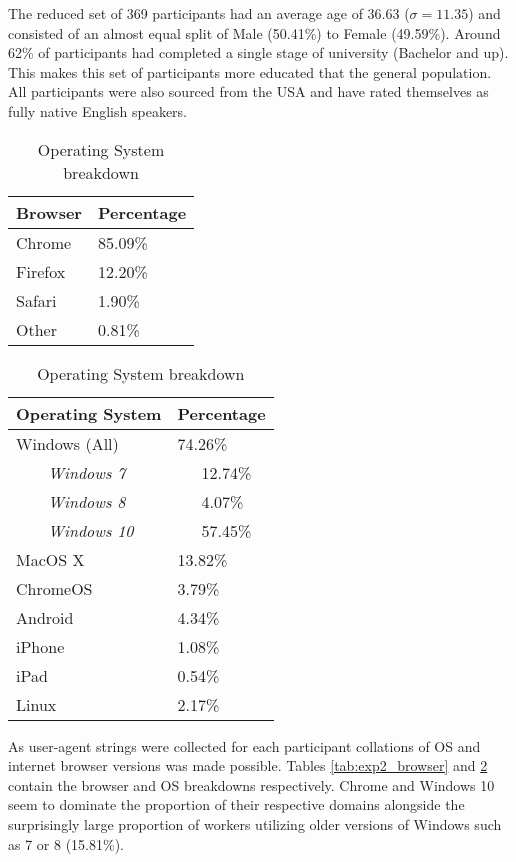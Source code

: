 The reduced set of 369 participants had an average age of 36.63 ($\sigma = 11.35$) and consisted of an almost equal split of Male (50.41\%) to Female (49.59\%). Around 62\% of participants had completed a single stage of university (Bachelor and up). This makes this set of participants more educated that the general population. All participants were also sourced from the USA and have rated themselves as fully native English speakers.
\begin{table}[!h]
    \centering
    \begin{tabular}{|l|l|}
        \hline
        Browser & Percentage \\
        \hline
        Chrome & 85.09\% \\
        Firefox & 12.20\% \\
        Safari & 1.90\% \\
        Other & 0.81\% \\
        \hline
    \end{tabular}
    \caption{Internet Browser breakdown}
    \label{tab:exp2_browser}
    \begin{tabular}{|l|l|}
        \hline
        Operating System & Percentage \\
        \hline
        
        \hline
        Windows (All) & 74.26\% \\
        ~~~~\textit{Windows 7} & ~~~12.74\% \\
        ~~~~\textit{Windows 8} & ~~~4.07\% \\
        ~~~~\textit{Windows 10} & ~~~57.45\% \\
        MacOS X	 & 13.82\% \\
        ChromeOS & 3.79\% \\
        Android	& 4.34\% \\
        iPhone	& 1.08\% \\
        iPad	& 0.54\% \\
        Linux	& 2.17\% \\
        \hline
    \end{tabular}
    \caption{Operating System breakdown}
    \label{tab:exp2_os}
\end{table}
    
As user-agent strings were collected for each participant collations of OS and internet browser versions was made possible. Tables \ref{tab:exp2_browser} and \ref{tab:exp2_os} contain the browser and OS breakdowns respectively. Chrome and Windows 10 seem to dominate the proportion of their respective domains alongside the surprisingly large proportion of workers utilizing older versions of Windows such as 7 or 8 (15.81\%).

